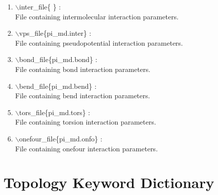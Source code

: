 \documentclass[12pt,titlepage]{article}
\begin{document}
\begin{enumerate}

 \vspace{0.15in} 
 \item  $\backslash$inter\_file\{ \} : \\
    File containing intermolecular interaction parameters.

 \vspace{0.15in} 
 \item  $\backslash$vps\_file\{pi\_md.inter\} : \\
    File containing pseudopotential interaction parameters.

 \vspace{0.15in} 
 \item  $\backslash$bond\_file\{pi\_md.bond\} : \\
    File containing bond interaction parameters.

 \vspace{0.15in} 
 \item  $\backslash$bend\_file\{pi\_md.bend\} : \\
    File containing bend interaction parameters.

 \vspace{0.15in} 
 \item  $\backslash$tors\_file\{pi\_md.tors\} : \\
    File containing torsion interaction parameters.

 \vspace{0.15in} 
 \item  $\backslash$onefour\_file\{pi\_md.onfo\} : \\
    File containing onefour interaction parameters.

\end{enumerate}

\newpage


\section{\bf Topology Keyword Dictionary} 
\end{document}
